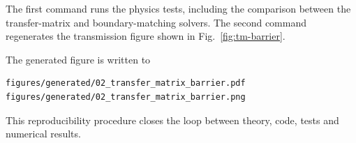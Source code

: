 The first command runs the physics tests, including the comparison
between the transfer-matrix and boundary-matching solvers. The second
command regenerates the transmission figure shown in
Fig.~\ref{fig:tm-barrier}.

The generated figure is written to

\begin{verbatim}
figures/generated/02_transfer_matrix_barrier.pdf
figures/generated/02_transfer_matrix_barrier.png
\end{verbatim}

This reproducibility procedure closes the loop between theory, code,
tests and numerical results.
